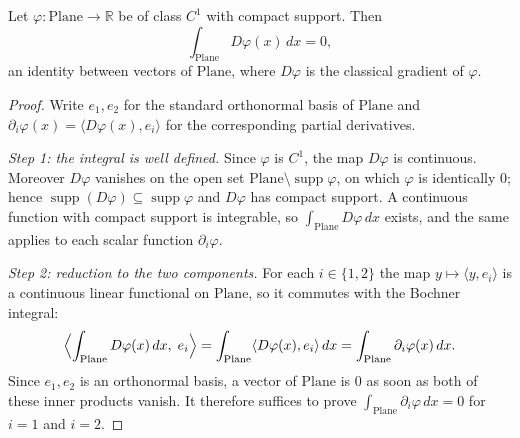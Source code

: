 \begin{lemma}
Let $\varphi\colon\mathrm{Plane}\to\mathbb{R}$ be of class $C^1$ with compact support.  Then
\[
  \int_{\mathrm{Plane}}D\varphi(x)\,dx = 0 ,
\]
an identity between vectors of $\mathrm{Plane}$, where $D\varphi$ is the classical gradient of
$\varphi$.
\end{lemma}
\begin{proof}
Write $e_1,e_2$ for the standard orthonormal basis of $\mathrm{Plane}$ and
$\partial_i\varphi(x)=\langle D\varphi(x),e_i\rangle$ for the corresponding partial
derivatives.

\emph{Step 1: the integral is well defined.}  Since $\varphi$ is $C^1$, the map $D\varphi$ is
continuous.  Moreover $D\varphi$ vanishes on the open set
$\mathrm{Plane}\setminus\operatorname{supp}\varphi$, on which $\varphi$ is identically $0$;
hence $\operatorname{supp}(D\varphi)\subseteq\operatorname{supp}\varphi$ and $D\varphi$ has
compact support.  A continuous function with compact support is integrable, so
$\int_{\mathrm{Plane}}D\varphi\,dx$ exists, and the same applies to each scalar function
$\partial_i\varphi$.

\emph{Step 2: reduction to the two components.}  For each $i\in\{1,2\}$ the map
$y\mapsto\langle y,e_i\rangle$ is a continuous linear functional on $\mathrm{Plane}$, so it
commutes with the Bochner integral:
\[
  \Bigl\langle\int_{\mathrm{Plane}}D\varphi(x)\,dx,\;e_i\Bigr\rangle
  =\int_{\mathrm{Plane}}\langle D\varphi(x),e_i\rangle\,dx
  =\int_{\mathrm{Plane}}\partial_i\varphi(x)\,dx .
\]
Since $e_1,e_2$ is an orthonormal basis, a vector of $\mathrm{Plane}$ is $0$ as soon as both
of these inner products vanish.  It therefore suffices to prove
$\int_{\mathrm{Plane}}\partial_i\varphi\,dx=0$ for $i=1$ and $i=2$.


\end{proof}
